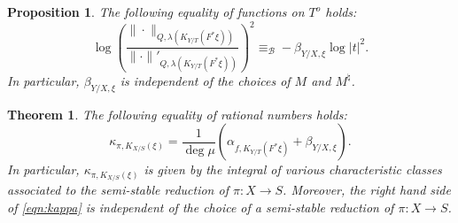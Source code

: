 \documentclass[10pt,a4paper]{amsart}
\newtheorem{theorem}{Theorem}
\newtheorem{proposition}{Proposition}
\begin{document}
\begin{proposition}
\label{prop:comparison:quillen}
The following equality of functions on $T^{o}$ holds:
$$
\log \left( \frac{\|\cdot\|_{Q,\lambda( K_{Y/T}(F^{*}\xi) )}}{\|\cdot\|'_{Q,\lambda( K_{Y/T}(F^{*}\xi) )}} \right)^{2} 
\equiv_{\mathcal B} -\beta_{Y/X, \xi} \log|t|^{2}.
$$
In particular, $\beta_{Y/X, \xi}$ is independent of the choices of $M$ and $M^{\natural}$.
\end{proposition}

\begin{theorem}
\label{thm:leading:term:torsion}
The following equality of rational numbers holds:
\begin{equation}
\label{eqn:kappa}
\kappa_{\pi, K_{X/S}(\xi)} = \frac{1}{\deg\mu} \left( \alpha_{f, K_{Y/T}(F^{*}\xi)} + \beta_{Y/X, \xi } \right).
\end{equation}
In particular, $\kappa_{\pi, K_{X/S}(\xi)}$ is given by the integral of various characteristic classes associated to 
the semi-stable reduction of $\pi \colon X \to S$.
Moreover, the right hand side of \eqref{eqn:kappa} is independent of the choice of a semi-stable reduction of $\pi \colon X \to S$.
\end{theorem}
\end{document}

